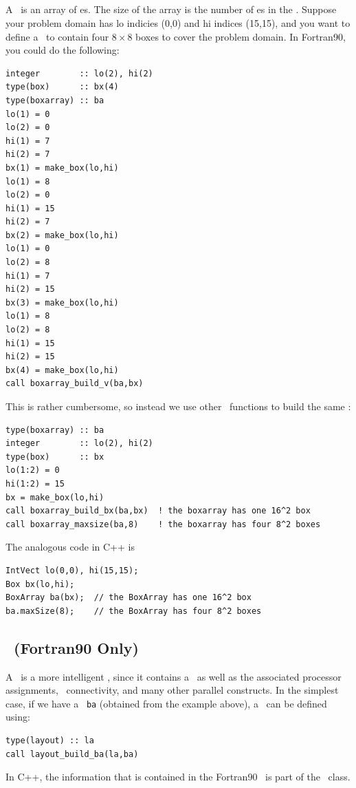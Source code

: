 \subsection{\BoxArray}

A \BoxArray\ is an array of \BoxType es.  The size of the array is the 
number of \BoxType es in the \BoxArray.  Suppose your problem domain
has lo indicies (0,0) and hi indices (15,15), and you want to define
a \BoxArray\ to contain four $8\times 8$ boxes to cover the problem domain.
In Fortran90, you could do the following:
\begin{lstlisting}[backgroundcolor=\color{light-green}]
integer        :: lo(2), hi(2)
type(box)      :: bx(4)
type(boxarray) :: ba
lo(1) = 0
lo(2) = 0
hi(1) = 7
hi(2) = 7
bx(1) = make_box(lo,hi)
lo(1) = 8
lo(2) = 0
hi(1) = 15
hi(2) = 7
bx(2) = make_box(lo,hi)
lo(1) = 0
lo(2) = 8
hi(1) = 7
hi(2) = 15
bx(3) = make_box(lo,hi)
lo(1) = 8
lo(2) = 8
hi(1) = 15
hi(2) = 15
bx(4) = make_box(lo,hi)
call boxarray_build_v(ba,bx)
\end{lstlisting}
This is rather cumbersome, so instead we use other \BoxLib\ functions to
build the same \BoxArray:
\begin{lstlisting}[backgroundcolor=\color{light-green}]
type(boxarray) :: ba
integer        :: lo(2), hi(2)
type(box)      :: bx
lo(1:2) = 0
hi(1:2) = 15
bx = make_box(lo,hi)
call boxarray_build_bx(ba,bx)  ! the boxarray has one 16^2 box
call boxarray_maxsize(ba,8)    ! the boxarray has four 8^2 boxes
\end{lstlisting}
The analogous code in C++ is
\begin{lstlisting}[backgroundcolor=\color{light-blue}]
IntVect lo(0,0), hi(15,15);
Box bx(lo,hi);
BoxArray ba(bx);  // the BoxArray has one 16^2 box
ba.maxSize(8);    // the BoxArray has four 8^2 boxes
\end{lstlisting}

\subsection{\layout\ (Fortran90 Only)}

A \layout\ is a more intelligent \BoxArray, since it contains a \BoxArray\ as well
as the associated processor assignments, \BoxType\ connectivity, and many other
parallel constructs.  In the simplest case, if we have a \BoxArray\ {\tt ba} (obtained
from the example above), a 
\layout\ can be defined using:
\begin{lstlisting}[backgroundcolor=\color{light-green}]
type(layout) :: la
call layout_build_ba(la,ba)
\end{lstlisting}
In C++, the information that is contained in the Fortran90 \layout\ is part of
the \MultiFab\ class.

